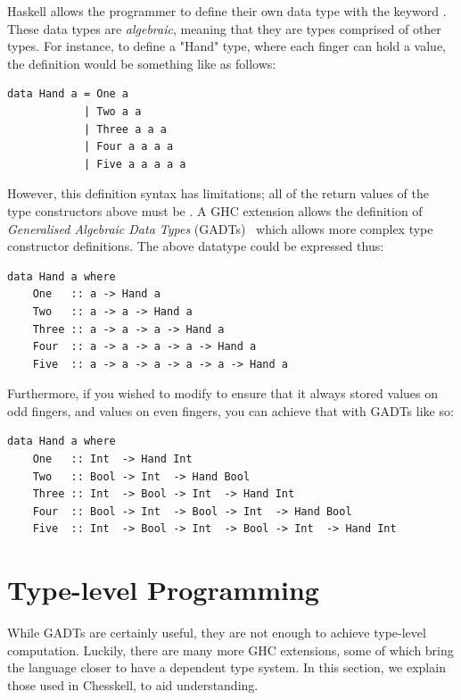 Haskell allows the programmer to define their own data type with the keyword . These data types are \emph{algebraic}, meaning that they are types comprised of other types. For instance, to define a "Hand" type, where each finger can hold a value, the definition would be something like as follows:

\begin{lstlisting}
data Hand a = One a
            | Two a a
            | Three a a a
            | Four a a a a
            | Five a a a a a
\end{lstlisting}

However, this definition syntax has limitations; all of the return values of the type constructors above must be . A GHC extension allows the definition of \emph{Generalised Algebraic Data Types} (GADTs)~\cite{gadts} which allows more complex type constructor definitions. The above  datatype could be expressed thus:

\begin{lstlisting}
data Hand a where
    One   :: a -> Hand a
    Two   :: a -> a -> Hand a
    Three :: a -> a -> a -> Hand a
    Four  :: a -> a -> a -> a -> Hand a
    Five  :: a -> a -> a -> a -> a -> Hand a
\end{lstlisting}

Furthermore, if you wished to modify  to ensure that it always stored  values on odd fingers, and  values on even fingers, you can achieve that with GADTs like so:

\begin{lstlisting}
data Hand a where
    One   :: Int  -> Hand Int
    Two   :: Bool -> Int  -> Hand Bool
    Three :: Int  -> Bool -> Int  -> Hand Int
    Four  :: Bool -> Int  -> Bool -> Int  -> Hand Bool
    Five  :: Int  -> Bool -> Int  -> Bool -> Int  -> Hand Int
\end{lstlisting}

\section{Type-level Programming} \label{typelevelprogrammingbackground}

While GADTs are certainly useful, they are not enough to achieve type-level computation. Luckily, there are many more GHC extensions, some of which bring the language closer to have a dependent type system. In this section, we explain those used in Chesskell, to aid understanding.

